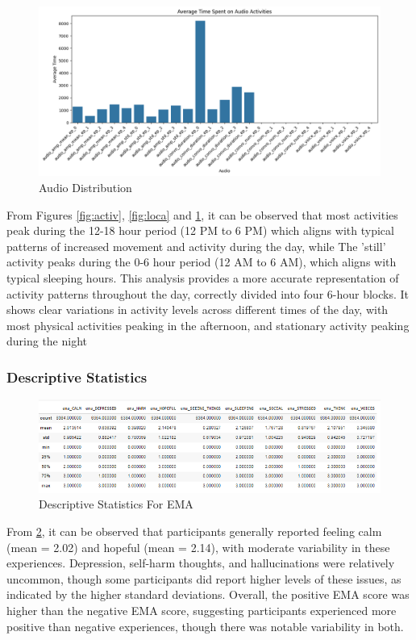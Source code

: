 \begin{figure}[H]
    \centering
    \includegraphics[width=0.5\linewidth]{Dissertation 24/activt.png}
    \caption{Audio Distribution}
    \label{fig:audio}
\end{figure}
From Figures \ref{fig:activ}, \ref{fig:loca} and \ref{fig:audio},  it can be observed that most activities peak during the 12-18 hour period (12 PM to 6 PM) which aligns with typical patterns of increased movement and activity during the day, while The 'still' activity peaks during the 0-6 hour period (12 AM to 6 AM), which aligns with typical sleeping hours. This analysis provides a more accurate representation of activity patterns throughout the day, correctly divided into four 6-hour blocks. It shows clear variations in activity levels across different times of the day, with most physical activities peaking in the afternoon, and stationary activity peaking during the night

\subsubsection{Descriptive Statistics}
\begin{figure}[H]
    \centering
    \includegraphics[width=0.5\linewidth]{descript.png}
    \caption{Descriptive Statistics For EMA}
    \label{fig:descr}
\end{figure}

From \ref{fig:descr}, it can be observed that participants generally reported feeling calm (mean = 2.02) and hopeful (mean = 2.14), with moderate variability in these experiences. Depression, self-harm thoughts, and hallucinations were relatively uncommon, though some participants did report higher levels of these issues, as indicated by the higher standard deviations. Overall, the positive EMA score was higher than the negative EMA score, suggesting participants experienced more positive than negative experiences, though there was notable variability in both. 

